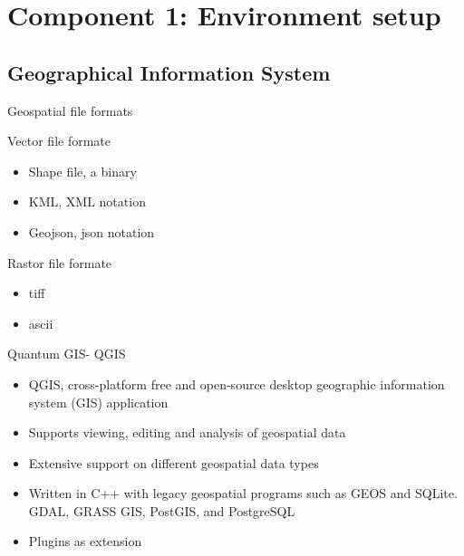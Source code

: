 \section[Component 1]{Component 1: Environment setup}
\subsection[Geographical Information System]{Geographical Information System}

\begin{frame}{Geospatial file formats}
	\begin{beamerboxesrounded}{Vector file formate}
		\begin{itemize}
			\item Shape file, a binary 
			\item KML, XML notation 
			\item Geojson, json notation
		\end{itemize}
	\end{beamerboxesrounded}
	\begin{beamerboxesrounded}{Rastor file formate}
		\begin{itemize}
			\item tiff
			\item ascii  
		\end{itemize}
	\end{beamerboxesrounded}
\end{frame}

\begin{frame}{Quantum GIS- QGIS}
		\begin{beamerboxesrounded}{}
			\begin{itemize}
				\item QGIS, cross-platform free and open-source desktop geographic information system (GIS) application
				\item Supports viewing, editing and analysis of geospatial data 
				\item Extensive support on different geospatial data types
				\item Written in C++ with legacy geospatial programs such as GEOS and SQLite. GDAL, GRASS GIS, PostGIS, and PostgreSQL
				\item Plugins as extension 
			\end{itemize}
		\end{beamerboxesrounded}
	\end{frame}
	
